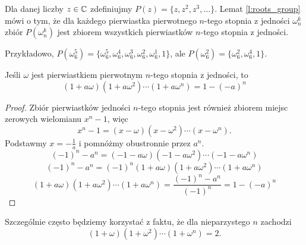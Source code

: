 \documentclass{scrartcl}
\begin{document}
    \begin{remark*}
        Dla danej liczby $z \in \mathbb C$ zdefiniujmy $P(z) = \{z, z^2, z^3, \ldots\}$. Lemat \ref{l:roots_group} mówi o tym, że dla każdego pierwiastka pierwotnego $n$-tego stopnia z jedności $\omega_n^k$ zbiór $P(\omega_n^k)$ jest zbiorem wszystkich pierwiastków $n$-tego stopnia z jedności.

        Przykładowo, $P(\omega_6^5) = \{\omega_6^5, \omega_6^4, \omega_6^3, \omega_6^2, \omega_6^1, 1\}$, ale $P(\omega_6^2) = \{\omega_6^2, \omega_6^4, 1\}$.
    \end{remark*}

    \begin{lemma}
        \label{l:roots_plus_one_prod}
        Jeśli $\omega$ jest pierwiastkiem pierwotnym $n$-tego stopnia z jedności, to
        $$ (1 + a\omega)(1 + a\omega^2)\cdots(1 + a\omega^n) = 1 - (-a)^n $$
    \end{lemma}
    \begin{proof}
        Zbiór pierwiastków jedności $n$-tego stopnia jest również zbiorem miejsc zerowych wielomianu $x^n - 1$, więc
        $$ x^n - 1 = (x - \omega)(x - \omega^2)\cdots(x - \omega^n). $$
        Podstawmy $x = -\frac{1}{a}$ i pomnóżmy obustronnie przez $a^n$.
        $$ (-1)^n - a^n = (-1 - a\omega)(-1 - a\omega^2)\cdots(-1 - a\omega^n) $$
        $$ (-1)^n - a^n = (-1)^n(1 + a\omega)(1 + a\omega^2)\cdots(1 + a\omega^n) $$
        $$ (1 + a\omega)(1 + a\omega^2)\cdots(1 + a\omega^n) = \frac{(-1)^n - a^n}{(-1)^n} = 1 - (-a)^n $$
    \end{proof}

    Szczególnie często będziemy korzystać z faktu, że dla nieparzystego $n$ zachodzi
    $$ (1 + \omega)(1 + \omega^2)\cdots(1 + \omega^n) = 2. $$
\end{document}
